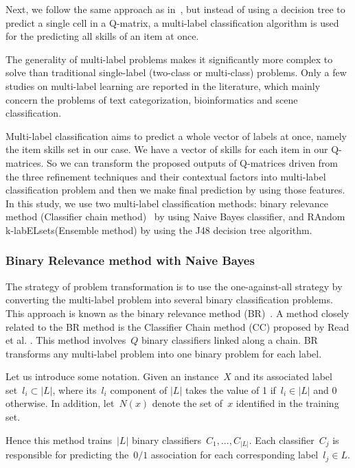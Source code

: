 \documentclass[runningheads,a4paper]{llncs}
\begin{document}
Next, we follow the same approach as in~\cite{desmarais2015combining}, but instead of using a decision tree to predict a single cell in a Q-matrix, a multi-label classification algorithm is used for the predicting all skills of an item at once. 

The generality of multi-label problems makes it significantly more complex to solve than traditional single-label (two-class or multi-class) problems. Only a few studies on multi-label learning are reported in the literature, which mainly concern the problems of text categorization, bioinformatics and scene classification. 

Multi-label classification aims to predict a whole vector of labels at once, namely the item skills set in our case. We have a vector of skills for each item in our Q-matrices. So we can transform the proposed outputs of Q-matrices driven from the three refinement techniques and their contextual factors into multi-label classification problem and then we make final prediction by using those features. In this study, we use two multi-label classification methods: binary relevance method (Classifier chain method)~\cite{read2011classifier} by using Naive Bayes classifier, and RAndom k-labELsets(Ensemble method) \cite{Tsoumakas2011random} by using the J48 decision tree algorithm.
 
\subsubsection{Binary Relevance method with Naive Bayes}
The strategy of problem transformation is to use the one-against-all strategy by converting the multi-label problem into several binary classification problems. This approach is known as the binary relevance method (BR)~\cite{read2011classifier}. A method closely related to the BR method is the Classifier Chain method (CC) proposed by Read et al. \cite{read2011classifier}. This method involves~$Q$ binary classifiers linked along a chain. BR transforms any multi-label problem into one binary problem for each label. 

Let us introduce some notation. Given an instance~$X$ and its associated label set~$l_i \subset |L|$, where its~$l_i$ component of  $ |L|$ takes the value of 1 if~$l_i \in |L|$ and 0 otherwise. In addition, let~$N(x)$ denote the set of~$x$ identified in the training set.

Hence this method trains~$|L|$ binary classifiers~$C_1,...,C_{|L|}$. Each classifier~$C_j$ is responsible for predicting the~$0/1$ association for each corresponding label~$l_j \in L$.\\
\end{document}
